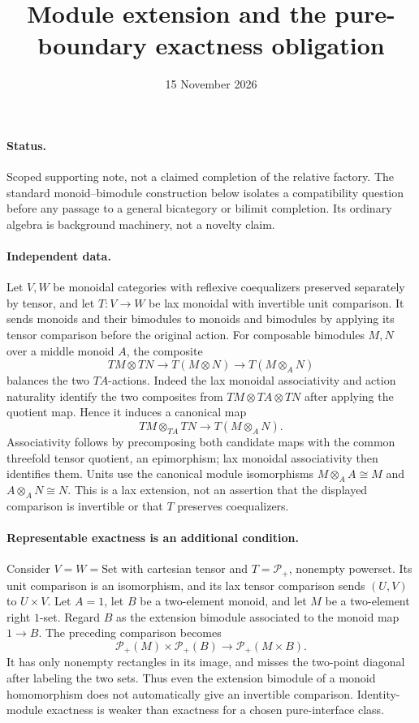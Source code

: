 \documentclass{article}
\title{Module extension and the pure-boundary exactness obligation}
\date{15 November 2026}
\begin{document}
\maketitle
\paragraph{Status.} Scoped supporting note, not a claimed completion of the relative factory. The standard monoid--bimodule construction below isolates a compatibility question before any passage to a general bicategory or bilimit completion. Its ordinary algebra is background machinery, not a novelty claim.

\paragraph{Independent data.} Let $V,W$ be monoidal categories with reflexive coequalizers preserved separately by tensor, and let $T:V\to W$ be lax monoidal with invertible unit comparison. It sends monoids and their bimodules to monoids and bimodules by applying its tensor comparison before the original action. For composable bimodules $M,N$ over a middle monoid $A$, the composite
\[
 TM\otimes TN\longrightarrow T(M\otimes N)\longrightarrow T(M\otimes_A N)
\]
balances the two $TA$-actions. Indeed the lax monoidal associativity and action naturality identify the two composites from $TM\otimes TA\otimes TN$ after applying the quotient map. Hence it induces a canonical map
\[
 TM\otimes_{TA}TN\longrightarrow T(M\otimes_A N).
\]
Associativity follows by precomposing both candidate maps with the common threefold tensor quotient, an epimorphism; lax monoidal associativity then identifies them. Units use the canonical module isomorphisms $M\otimes_A A\cong M$ and $A\otimes_A N\cong N$. This is a lax extension, not an assertion that the displayed comparison is invertible or that $T$ preserves coequalizers.

\paragraph{Representable exactness is an additional condition.} Consider $V=W=\mathrm{Set}$ with cartesian tensor and $T=\mathcal P_+$, nonempty powerset. Its unit comparison is an isomorphism, and its lax tensor comparison sends $(U,V)$ to $U\times V$. Let $A=1$, let $B$ be a two-element monoid, and let $M$ be a two-element right $1$-set. Regard $B$ as the extension bimodule associated to the monoid map $1\to B$. The preceding comparison becomes
\[
 \mathcal P_+(M)\times\mathcal P_+(B)
 \longrightarrow \mathcal P_+(M\times B).
\]
It has only nonempty rectangles in its image, and misses the two-point diagonal after labeling the two sets. Thus even the extension bimodule of a monoid homomorphism does not automatically give an invertible comparison. Identity-module exactness is weaker than exactness for a chosen pure-interface class.
\end{document}
